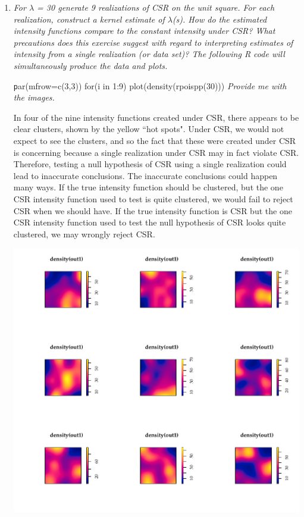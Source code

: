 \documentclass{article}\usepackage[]{graphicx}\usepackage[]{color}
\makeatletter
\def\maxwidth{ %
  \ifdim\Gin@nat@width>\linewidth
    \linewidth
  \else
    \Gin@nat@width
  \fi
}
\newenvironment{knitrout}{}{} %
\makeatother
\begin{document}
\begin{enumerate}
\item %
{\it For $\lambda$ = 30 generate 9 realizations of CSR on the unit square. For each realization, construct a kernel estimate of $\lambda$(s). How do the estimated intensity functions compare to the constant intensity under CSR? What precautions does this exercise suggest with regard to interpreting estimates of intensity from a single realization (or data set)? The following R code will simultaneously produce the data and plots.}

{\texttt par(mfrow=c(3,3))
  for(i in 1:9) plot(density(rpoispp(30)))}
{\it Provide me with the images.}

In four of the nine intensity functions created under CSR, there appears to be clear clusters, shown by the yellow ``hot spots". Under CSR, we would not expect to see the clusters, and so the fact that these were created under CSR is concerning because a single realization under CSR may in fact violate CSR. Therefore, testing a null hypothesis of CSR using a single realization could lead to inaccurate conclusions. The inaccurate conclusions could happen many ways. If the true intensity function should be clustered, but the one CSR intensity function used to test is quite clustered, we would fail to reject CSR when we should have. If the true intensity function is CSR but the one CSR intensity function used to test the null hypothesis of CSR looks quite clustered, we may wrongly reject CSR.

\begin{knitrout}\footnotesize
{}\color{fgcolor}

{\centering \includegraphics[width=\maxwidth]{figure/prob1-1} 

}
\end{knitrout}
\end{enumerate}
\end{document}
